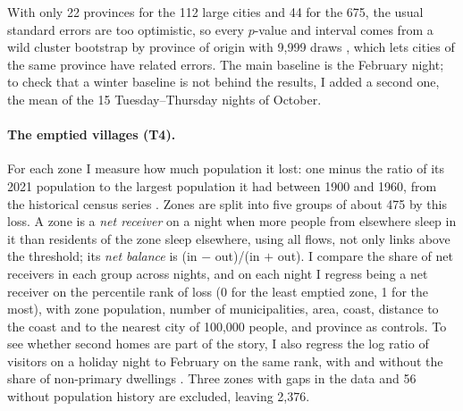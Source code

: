 With only 22 provinces for the 112 large cities and 44 for the 675, the usual standard errors are too optimistic, so every $p$-value and interval comes from a wild cluster bootstrap by province of origin with 9,999 draws \citep{kline2012score}, which lets cities of the same province have related errors. The main baseline is the February night; to check that a winter baseline is not behind the results, I added a second one, the mean of the 15 Tuesday--Thursday nights of October.

\paragraph{The emptied villages (T4).} For each zone I measure how much population it lost: one minus the ratio of its 2021 population to the largest population it had between 1900 and 1960, from the historical census series \citep{ine2026intercensal}. Zones are split into five groups of about 475 by this loss. A zone is a \emph{net receiver} on a night when more people from elsewhere sleep in it than residents of the zone sleep elsewhere, using all flows, not only links above the threshold; its \emph{net balance} is (in $-$ out)/(in $+$ out). I compare the share of net receivers in each group across nights, and on each night I regress being a net receiver on the percentile rank of loss (0 for the least emptied zone, 1 for the most), with zone population, number of municipalities, area, coast, distance to the coast and to the nearest city of 100,000 people, and province as controls. To see whether second homes are part of the story, I also regress the log ratio of visitors on a holiday night to February on the same rank, with and without the share of non-primary dwellings \citep{ine2023viviendas}. Three zones with gaps in the data and 56 without population history are excluded, leaving 2,376.

